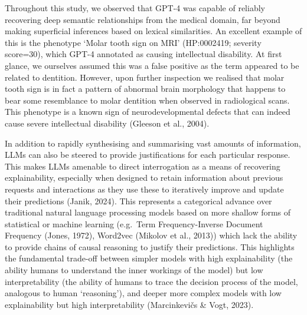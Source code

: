 \documentclass[
]{agujournal2019}
\begin{document}
Throughout this study, we observed that GPT-4 was capable of reliably
recovering deep semantic relationships from the medical domain, far
beyond making superficial inferences based on lexical similarities. An
excellent example of this is the phenotype `Molar tooth sign on MRI'
(HP:0002419; severity score=30), which GPT-4 annotated as causing
intellectual disability. At first glance, we ourselves assumed this was
a false positive as the term appeared to be related to dentition.
However, upon further inspection we realised that molar tooth sign is in
fact a pattern of abnormal brain morphology that happens to bear some
resemblance to molar dentition when observed in radiological scans. This
phenotype is a known sign of neurodevelopmental defects that can indeed
cause severe intellectual disability (Gleeson et al., 2004).

In addition to rapidly synthesising and summarising vast amounts of
information, LLMs can also be steered to provide justifications for each
particular response. This makes LLMs amenable to direct interrogation as
a means of recovering explainability, especially when designed to retain
information about previous requests and interactions as they use these
to iteratively improve and update their predictions (Janik, 2024). This
represents a categorical advance over traditional natural language
processing models based on more shallow forms of statistical or machine
learning (e.g.~Term Frequency-Inverse Document Frequency (Jones, 1972),
Word2vec (Mikolov et al., 2013)) which lack the ability to provide
chains of causal reasoning to justify their predictions. This highlights
the fundamental trade-off between simpler models with high
explainability (the ability humans to understand the inner workings of
the model) but low interpretability (the ability of humans to trace the
decision process of the model, analogous to human `reasoning'), and
deeper more complex models with low explainability but high
interpretability (Marcinkevičs \& Vogt, 2023).
\end{document}
